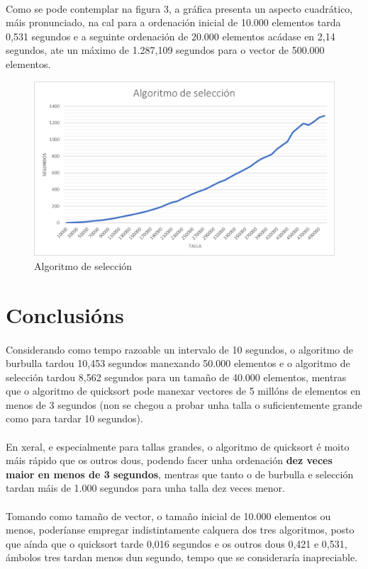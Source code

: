 \documentclass[12pt]{article}
\begin{document}
	\paragraph{}
	Como se pode contemplar na figura 3, a gráfica presenta un aspecto cuadrático, máis pronunciado, na cal para a ordenación inicial de 10.000 elementos tarda 0,531 segundos e a seguinte ordenación de 20.000 elementos acádase en 2,14 segundos, ate un máximo de 1.287,109 segundos para o vector de 500.000 elementos.\\
	\begin{figure}[h]
		\centering
		\includegraphics[scale=0.45]{../graficas/seleccion_sobremesa.png}
		\caption{Algoritmo de selección}
	\end{figure}

\newpage
\section{Conclusións}
	\paragraph{}
	Considerando como tempo razoable un intervalo de 10 segundos, o algoritmo de burbulla tardou 10,453 segundos manexando 50.000 elementos e o algoritmo de selección tardou 8,562 segundos para un tamaño de 40.000 elementos, mentras que o algoritmo de quicksort pode manexar vectores de 5 millóns de elementos en menos de 3 segundos (non se chegou a probar unha talla o suficientemente grande como para tardar 10 segundos).
	\paragraph{}
	En xeral, e especialmente para tallas grandes, o algoritmo de quicksort é moito máis rápido que os outros dous, podendo facer unha ordenación \textbf{dez veces maior en menos de 3 segundos}, mentras que tanto o de burbulla e selección tardan máis de 1.000 segundos para unha talla dez veces menor.
	\paragraph{}
	Tomando como tamaño de vector, o tamaño inicial de 10.000 elementos ou menos, poderíanse empregar indistintamente calquera dos tres algoritmos, posto que aínda que o quicksort tarde 0,016 segundos e os outros dous 0,421 e 0,531, ámbolos tres tardan menos dun segundo, tempo que se consideraría inapreciable.
	
\end{document}
